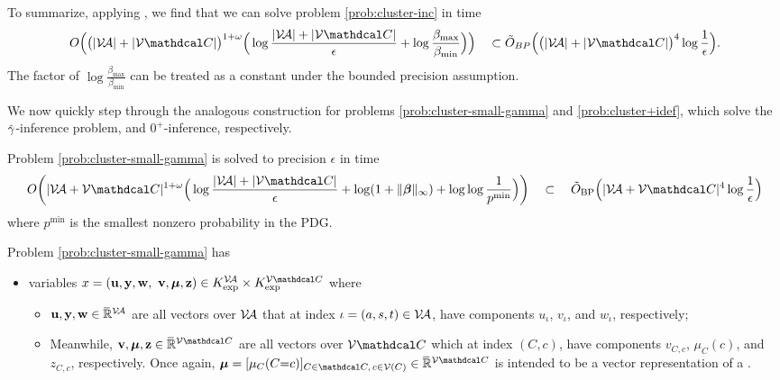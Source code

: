 \begin{subappendices}
\begin{lproof}
    To summarize, applying , we find that we can solve problem \eqref{prob:cluster-inc} in time
    \begin{align*}
        O\Big( \big(|\V\!\Ar| + |\V\C|\big)^{1 + \omega} \Big( \log \frac{ |\V\!\Ar| + |\V\C| }{\epsilon} + \log \frac{\beta_{\max}}{\beta_{\min}} \Big) \Big)
        \quad
        \subset \tilde O_{BP}\Big( \big(|\V\!\Ar| + |\V\C| \big)^4 \log \frac1\epsilon\Big).
    \end{align*}
    The factor of $\log\frac{\beta_{\max}}{\beta_{\min}}$ can be treated as a constant under the bounded precision assumption.
\end{lproof}

We now quickly step through the analogous construction for problems \eqref{prob:cluster-small-gamma} and \eqref{prob:cluster+idef}, which
solve the $\zogamma$-inference problem, and $0^+$-inference, respectively.

\begin{lemma}\label{lem:smallgamma-polytime}
    Problem \eqref{prob:cluster-small-gamma} is solved to precision $\epsilon$ in time
    \[
        O\bigg( |\V\!\Ar + \V\C|^{1 + \omega} \Big( \log \frac{ |\V\!\Ar| + |\V\C|}{\epsilon} + \log(1+ \Vert\bbeta\Vert_\infty) + \log \log \frac{1}{p^{\min}} \Big) \bigg)
        \quad
        \subset
        \quad
        \tilde O_{\text{BP}}\Big( |\V\!\Ar + \V\C|^4 \log\frac1\epsilon \Big)
    \]
    where $p^{\min}$ is the smallest nonzero probability in the PDG.
\end{lemma}
\begin{lproof}
    Problem \eqref{prob:cluster-small-gamma} has
    \begin{itemize}[label=$\blacktriangleright$]
    \item variables
        $x = (\mat u, \mat y, \mat w,\,\, \mat v, \bmu, \mat z)
        \in K_{\exp}^{\V\!\Ar} \times K_{\exp}^{\V \C}$
        where
        \begin{itemize}[label=\textbullet]
        \item
        $\mathbf{u,y,w} \in \mskip1mu\overline{\mskip-1mu\mathbb R\!}\,^{\mathcal V\!\mathcal A}$
            are all vectors over $\mathcal V\!\mathcal A$
            that at index $\iota = (a,s,t) \in \mathcal V\!\mathcal A$, have
            components $u_\iota$, $v_\iota$, and $w_\iota$, respectively;
        \item
        Meanwhile,
        $\mathbf{v,\bmu,z} \in \Rext^{\V\C}$
            are all vectors over $\V\C$
            which at index $(C,c)$, have
            components $v_{C,c}$, $\mu_C(c)$, and $z_{C,c}$, respectively.
            Once again, $\bmu = [\mu_{C}(C{=}c)]_%
            {C \in \C,\,c \in\V(C)}
             \in \Rext^{\V \C}$ is intended to be a vector representation of a \actree.
    \end{itemize}


\end{itemize}
\end{lproof}
\end{subappendices}
